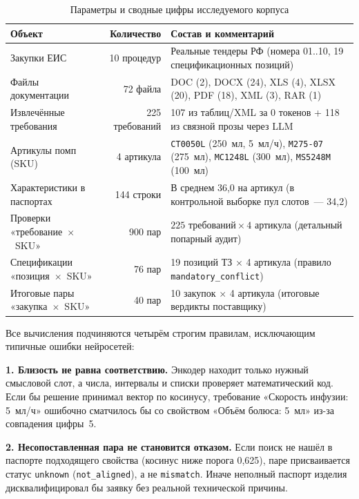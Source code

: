 \documentclass[10pt,a4paper]{article}
\begin{document}
\begin{table}[htbp]
\centering
\small
\caption{Параметры и сводные цифры исследуемого корпуса}
\label{tab:corpus_stats}
\begin{tabularx}{\textwidth}{l r Y}
\toprule
\textbf{Объект} & \textbf{Количество} & \textbf{Состав и комментарий} \\
\midrule
Закупки ЕИС & 10 процедур & Реальные тендеры РФ (номера 01..10, 19 спецификационных позиций) \\
Файлы документации & 72 файла & DOC (2), DOCX (24), XLS (4), XLSX (20), PDF (18), XML (3), RAR (1) \\
Извлечённые требования & 225 требований & 107 из таблиц/XML за 0 токенов + 118 из связной прозы через LLM \\
Артикулы помп (SKU) & 4 артикула & \texttt{CT0050L} (250~мл, 5~мл/ч), \texttt{M275-07} (275~мл), \texttt{MC1248L} (300~мл), \texttt{MS5248M} (100~мл) \\
Характеристики в паспортах & 144 строки & В среднем 36,0 на артикул (в контрольной выборке пул слотов~--- 34,2) \\
Проверки «требование~$\times$~SKU» & 900 пар & $225 \text{ требований} \times 4 \text{ артикула}$ (детальный попарный аудит) \\
Спецификации «позиция~$\times$~SKU» & 76 пар & 19 позиций ТЗ $\times$ 4 артикула (правило \texttt{mandatory\_conflict}) \\
Итоговые пары «закупка~$\times$~SKU» & 40 пар & 10 закупок $\times$ 4 артикула (итоговые вердикты поставщику) \\
\bottomrule
\end{tabularx}
\end{table}

Все вычисления подчиняются четырём строгим правилам, исключающим типичные ошибки нейросетей:

\textbf{1. Близость не равна соответствию.} Энкодер находит только нужный смысловой слот, а числа, интервалы и списки проверяет математический код. Если бы решение принимал вектор по косинусу, требование «Скорость инфузии: 5~мл/ч» ошибочно сматчилось бы со свойством «Объём болюса: 5~мл» из-за совпадения цифры~5.

\textbf{2. Несопоставленная пара не становится отказом.} Если поиск не нашёл в паспорте подходящего свойства (косинус ниже порога 0,625), паре присваивается статус \texttt{unknown} (\texttt{not\_aligned}), а не \texttt{mismatch}. Иначе неполный паспорт изделия дисквалифицировал бы заявку без реальной технической причины.
\end{document}
